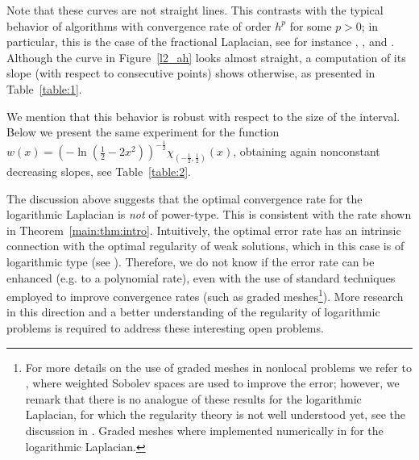 \documentclass[11 pt]{article}
\numberwithin{equation}{section}
\begin{document}
Note that these curves are not straight lines. This contrasts with the typical behavior of algorithms with convergence rate of order $h^p$ for some $p>0$; in particular, this is the case of the fractional Laplacian, see for instance \cite[Figure 8]{BH17}, \cite[Figure 1]{AB17}, and \cite[Table 3]{HSJSS23}. Although the curve in Figure~\ref{l2_ah} looks almost straight, a computation of its slope (with respect to consecutive points) shows otherwise, as presented in Table~\ref{table:1}.

We mention that this behavior is robust with respect to the size of the interval.  Below we present the same experiment for the function 
$w(x)=\left(
-\ln\left(\frac{1}{2}-2x^2\right)\right)^{-\frac{1}{2}} \chi_{(-\frac{1}{2},\frac{1}{2})}(x)$, obtaining again nonconstant decreasing slopes, see Table~\ref{table:2}.

The discussion above suggests that the optimal convergence rate for the logarithmic Laplacian is \emph{not} of power-type. This is consistent with the rate shown in Theorem~\ref{main:thm:intro}. Intuitively, the optimal error rate has an intrinsic connection with the optimal regularity of weak solutions, which in this case is of logarithmic type (see \cite[Theorem 1.2]{HSLRS23}). Therefore, we do not know if the error rate can be enhanced (e.g. to a polynomial rate), even with the use of standard techniques employed to improve convergence rates (such as graded meshes\footnote{For more details on the use of graded meshes in nonlocal problems we refer to \cite[Section 3.4]{Bor17}, where weighted Sobolev spaces are used to improve the error; however, we remark that there is no analogue of these results for the logarithmic Laplacian, for which the regularity theory is not well understood yet, see the discussion in \cite[Section 2]{CS22}.  Graded meshes where implemented numerically in \cite{L22} for the logarithmic Laplacian.}). More research in this direction and a better understanding of the regularity of logarithmic problems is required to address these interesting open problems.
\end{document}
